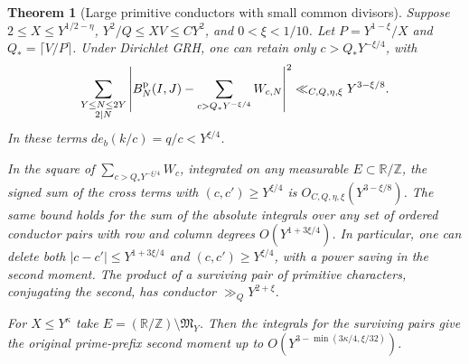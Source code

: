\documentclass[11pt,a4paper]{article}
\numberwithin{equation}{section}
\newtheorem{theorem}{Theorem}[section]
\begin{document}
\begin{theorem}[Large primitive conductors with small common divisors]
\label{thm:criticalgridcommonconductors}
Suppose $2\le X\le Y^{1/2-\eta}$, $Y^2/Q\le XV\le CY^2$,
and $0<\xi<1/10$. Let $P=Y^{1-\xi}/X$ and
$Q_*=\lceil V/P\rceil$. Under Dirichlet GRH, one can retain only
$c>Q_*Y^{-\xi/4}$, with
\begin{equation}
 \sum_{\substack{Y\le N\le2Y\\2\mid N}}
       \left|B_N^{\rm p}(I,J)-
                     \sum_{c>Q_*Y^{-\xi/4}}W_{c,N}\right|^2
          \ll_{C,Q,\eta,\xi}Y^{3-\xi/8}.
 \label{eq:criticalgridtopconductors}
\end{equation}
In these terms $d e_b(k/c)=q/c<Y^{\xi/4}$.

In the square of $\sum_{c>Q_*Y^{-\xi/4}}W_c$, integrated on any
measurable $E\subset\mathbb R/\mathbb Z$, the signed sum of
the cross terms with $(c,c')\ge Y^{\xi/4}$ is
$O_{C,Q,\eta,\xi}(Y^{3-\xi/8})$. The same bound holds
for the sum of the absolute integrals over any set of ordered
conductor pairs with row and column degrees
$O(Y^{1+3\xi/4})$. In particular, one can delete both
$|c-c'|\le Y^{1+3\xi/4}$ and $(c,c')\ge Y^{\xi/4}$,
with a power saving in the second moment. The product of a
surviving pair of primitive characters, conjugating the second,
has conductor $\gg_Q Y^{2+\xi}$.

For $X\le Y^\kappa$ take
$E=(\mathbb R/\mathbb Z)\setminus\mathfrak M_Y$.
Then the integrals for the surviving pairs give the original
prime-prefix second moment up to $O(Y^{3-\min(3\kappa/4,\xi/32)})$.
\end{theorem}
\end{document}
